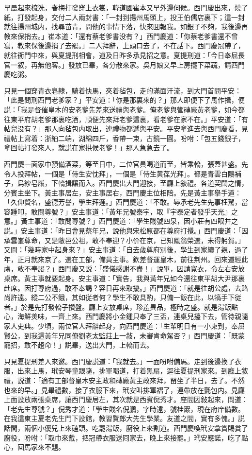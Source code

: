 早晨起來梳洗，春梅打發穿上衣裳，韓道國崔本又早外邊伺候。西門慶出來，燒了紙，打發起身，交付二人兩封書：「一封到揚州馬頭上，投王伯儒店裏下；這一封就往揚州城内，找尋苗青，問他的事情下落，快來囬報我。如銀子不夠，我後邊再教來保捎去。」崔本道：「還有蔡老爹書没有？」西門慶道：「你蔡老爹書還不曾寫，教來保後邊捎了去罷。」二人拜辭，上頭口去了，不在話下。西門慶冠帶了，就往衙門中來，與夏提刑相會，道及日昨多承見招之意。夏提刑道：「今日奉屈長官一叙，再無他客。」發放已畢，各分散來家。吳月娘又早上房擺下菜蔬，請西門慶吃粥。

只見一個穿青衣皂隸，騎着快馬，夾着毡包，走的滿面汗流，到大門首問平安：「此是問刑西門老爹家？」平安道：「你是那裏來的？」那人即便下了馬作揖，便説：「我是督催皇木的安老爹先差來送禮與老爹。俺老爹與管磚廠黃老爹，如今都往東平府胡老爹那裏吃酒，順便先來拜老爹這裏，看老爹在家不在。」平安道：「有帖兒没有？」那人向毡包内取出，連禮物都遞與平安。平安拿進去與西門慶看，見禮帖上寫着：浙紬二端，湖綿四斤，香帶一束，古鏡一圓。吩咐：「包五錢銀子，拿回帖打發來人，就説在家拱候老爹！」那人急急去了。

西門慶一面家中預備酒菜，等至日中，二位官員喝道而至，皆乘轎，張蓋甚盛。先令人投拜帖，一個是「侍生安忱拜」，一個是「侍生黄葆光拜」。都是青雲白鷴補子，烏紗皂履，下轎揖讓而入。西門慶出大門迎接，至廳上敍禮。各道契闊之情，分賓主坐下。黃主事居左，安主事居右，西門慶主位相陪。先是黃主事擧手道：「久仰賢名，盛德芳譽，學生拜遲。」西門慶道：「不敢。辱承老先生先事枉駕，當容踵叩，敢問尊號？」安主事道：「黃年兄號泰宇，取『宇泰定者發乎天光』之意。」黃主事道：「敢問尊號？」西門慶道：「學生賤號四泉，因小莊有四眼井之説。」安主事道：「昨日會見蔡年兄，說他與宋松原都在尊府打攪。」西門慶道：「因承雲峯尊命，又是敝邑公祖，敢不奉迎？小价在京，已知鳳翁榮選，未得躬賀。」又問：「幾時家中起身來？」安主事道：「自去歲尊府別後，學生到家續了親，過了年，正月就來京了。選在工部，備員主事。欽差督運皇木，前往荆州。回來道經此䖏，敢不奉謁？」西門慶又説：「盛儀感謝不盡！」說畢，因請寬衣，令左右安放桌席。黃主事就要起身。安主事道：「實告，我與黃年兄如今還往東平胡大尹那裏赴席。因打尊府過，敢不奉謁？容日再來取擾。」西門慶道：「就是往胡公處，去路尚許遠。縱二公不餓，其如従者何？學生不敢具酌，只備一飯在此，以犒手下従者。」於是先打發轎子攢盤。廳上安放桌席，珍羞異品，極時之盛。就是湯飯點心，海鮮羙味，一齊上來。西門慶將小金鍾只奉了三盃，連桌兒擡下去，管待親隨家人吏典。少頃，兩位官人拜辭起身，向西門慶道：「生輩明日有一小柬到，奉屈賢公，到我這黃年兄同僚劉老太監莊上一敍，未審肯命駕否？」西門慶道：「既蒙寵招，敢不趨命！」説畢，送出大門，上轎而去。

只見夏提刑差人來邀。西門慶説道：「我就去。」一面吩咐備馬。走到後邊換了衣服，出來上馬，玳安琴童跟隨，排軍喝道，打着黑扇，逕往夏提刑家來。到廳上敘禮，説道：「適有工部督皇木安主政和磚廠黃主政來拜，㽞坐了半日，去了。不然也來的早。」見畢禮數，接了衣服下來，玳安叫排軍褶了，連帶放在氈包内。見廳上面設放兩張桌席，讓西門慶居左，其次就是西賓倪秀才。座間因敍起來，問道：「老先生尊號？」倪秀才道：「學生賤名倪鵬，字時遠，號桂巖，現在府庠備數。在我這東主夏老先生門下設館，教習賢郎大先生學業。友道之間，實有多愧。」説話間，兩個小優兒上來磕頭。吃罷湯飯，廚役上來割道。西門慶喚玳安拿賞賜賞了廚役，吩咐：「取巾來戴，把冠帶衣服送囘家去，晚上來接罷。」玳安應諾，吃了點心，回馬家來不題。

